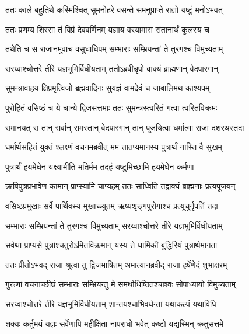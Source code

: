 
\twolineshloka
{ततः काले बहुतिथे कस्मिंश्चित् सुमनोहरे}
{वसन्ते समनुप्राप्ते राज्ञो यष्टुं मनोऽभवत्} %

\twolineshloka
{ततः प्रणम्य शिरसा तं विप्रं देववर्णिनम्}
{यज्ञाय वरयामास संतानार्थं कुलस्य च} %

\twolineshloka
{तथेति च स राजानमुवाच वसुधाधिपम्}
{सम्भाराः सम्भ्रियन्तां ते तुरगश्च विमुच्यताम्} %

\twolineshloka
{सरय्वाश्चोत्तरे तीरे यज्ञभूमिर्विधीयताम्}
{ततोऽब्रवीन्नृपो वाक्यं ब्राह्मणान् वेदपारगान्} %

\twolineshloka
{सुमन्त्रावाहय क्षिप्रमृत्विजो ब्रह्मवादिनः}
{सुयज्ञं वामदेवं च जाबालिमथ काश्यपम्} %

\twolineshloka
{पुरोहितं वसिष्ठं च ये चान्ये द्विजसत्तमाः}
{ततः सुमन्त्रस्त्वरितं गत्वा त्वरितविक्रमः} %

\twolineshloka
{समानयत् स तान् सर्वान् समस्तान् वेदपारगान्}
{तान् पूजयित्वा धर्मात्मा राजा दशरथस्तदा} %

\twolineshloka
{धर्मार्थसहितं युक्तं श्लक्ष्णं वचनमब्रवीत्}
{मम तातप्यमानस्य पुत्रार्थं नास्ति वै सुखम्} %

\twolineshloka
{पुत्रार्थं हयमेधेन यक्ष्यामीति मतिर्मम}
{तदहं यष्टुमिच्छामि हयमेधेन कर्मणा} %

\twolineshloka
{ऋषिपुत्रप्रभावेण कामान् प्राप्स्यामि चाप्यहम्}
{ततः साध्विति तद्वाक्यं ब्राह्मणाः प्रत्यपूजयन्} %

\twolineshloka
{वसिष्ठप्रमुखाः सर्वे पार्थिवस्य मुखाच्च्युतम्}
{ऋष्यशृङ्गपुरोगाश्च प्रत्यूचुर्नृपतिं तदा} %

\twolineshloka
{सम्भाराः सम्भ्रियन्तां ते तुरगश्च विमुच्यताम्}
{सरय्वाश्चोत्तरे तीरे यज्ञभूमिर्विधीयताम्} %

\twolineshloka
{सर्वथा प्राप्यसे पुत्रांश्चतुरोऽमितविक्रमान्}
{यस्य ते धार्मिकी बुद्धिरियं पुत्रार्थमागता} %

\twolineshloka
{ततः प्रीतोऽभवद् राजा श्रुत्वा तु द्विजभाषितम्}
{अमात्यानब्रवीद् राजा हर्षेणेदं शुभाक्षरम्} %

\twolineshloka
{गुरूणां वचनाच्छीघ्रं सम्भाराः सम्भ्रियन्तु मे}
{समर्थाधिष्ठितश्चाश्वः सोपाध्यायो विमुच्यताम्} %

\twolineshloka
{सरय्वाश्चोत्तरे तीरे यज्ञभूमिर्विधीयताम्}
{शान्तयश्चाभिवर्धन्तां यथाकल्पं यथाविधि} %

\twolineshloka
{शक्यः कर्तुमयं यज्ञः सर्वेणापि महीक्षिता}
{नापराधो भवेत् कष्टो यद्यस्मिन् क्रतुसत्तमे} %

